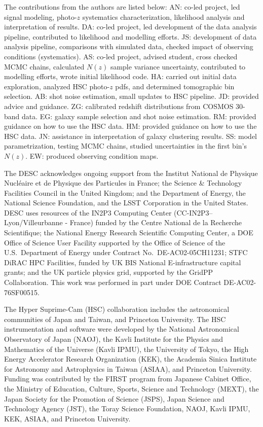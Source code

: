 \documentclass[a4paper,11pt]{article}
\begin{document}
  The contributions from the authors are listed below:
  AN: co-led project, led signal modeling, photo-$z$ systematics characterization, likelihood analysis and interpretation of results.
  DA: co-led project, led development of the data analysis pipeline, contributed to likelihood and modelling efforts.
  JS: development of data analysis pipeline, comparisons with simulated data, checked impact of observing conditions (systematics).
  AS: co-led project, advised student, cross checked MCMC chains, calculated $N(z)$ sample variance uncertainty, contributed to modelling efforts, wrote initial likelihood code.
  HA: carried out initial data exploration, analyzed HSC photo-$z$ pdfs, and determined tomographic bin selection.
  AB: shot noise estimation, small updates to HSC pipeline.
  JD: provided advice and guidance.
  ZG: calibrated redshift distributions from COSMOS 30-band data.
  EG: galaxy sample selection and shot noise estimation.
  RM: provided guidance on how to use the HSC data.
  HM: provided guidance on how to use the HSC data.
  JN: assistance in interpretation of galaxy clustering results.
  SS: model parametrization, testing MCMC chains, studied uncertainties in the first bin's $N(z)$.
  EW: produced observing condition maps.

  The DESC acknowledges ongoing support from the Institut National de Physique Nucl\'eaire et de Physique des Particules in France; the Science \& Technology Facilities Council in the United Kingdom; and the Department of Energy, the National Science Foundation, and the LSST Corporation in the United States.  DESC uses resources of the IN2P3 Computing Center (CC-IN2P3--Lyon/Villeurbanne - France) funded by the Centre National de la Recherche Scientifique; the National Energy Research Scientific Computing Center, a DOE Office of Science User Facility supported by the Office of Science of the U.S.\ Department of Energy under Contract No.\ DE-AC02-05CH11231; STFC DiRAC HPC Facilities, funded by UK BIS National E-infrastructure capital grants; and the UK particle physics grid, supported by the GridPP Collaboration.  This work was performed in part under DOE Contract DE-AC02-76SF00515.

  The Hyper Suprime-Cam (HSC) collaboration includes the astronomical communities of Japan and Taiwan, and Princeton University. The HSC instrumentation and software were developed by the National Astronomical Observatory of Japan (NAOJ), the Kavli Institute for the Physics and Mathematics of the Universe (Kavli IPMU), the University of Tokyo, the High Energy Accelerator Research Organization (KEK), the Academia Sinica Institute for Astronomy and Astrophysics in Taiwan (ASIAA), and Princeton University. Funding was contributed by the FIRST program from Japanese Cabinet Office, the Ministry of Education, Culture, Sports, Science and Technology (MEXT), the Japan Society for the Promotion of Science (JSPS), Japan Science and Technology Agency (JST), the Toray Science Foundation, NAOJ, Kavli IPMU, KEK, ASIAA, and Princeton University. 
\end{document}
